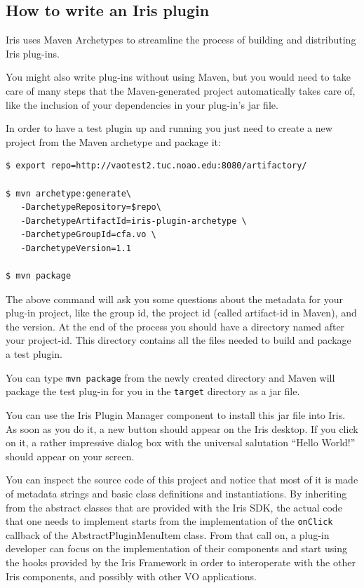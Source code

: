 \documentclass[5p]{elsarticle}
\begin{document}
\subsection{How to write an Iris plugin}
\label{sec:writeplugin}
Iris uses Maven Archetypes to streamline the process of building and distributing Iris plug-ins.

You might also write plug-ins without using Maven, but you would need to take care of many steps that the Maven-generated project automatically takes care of, like the inclusion of your dependencies in your plug-in's jar file.

In order to have a test plugin up and running you just need to create a new project from the Maven archetype and package it:

\begin{lstlisting}[style=code]
$ export repo=http://vaotest2.tuc.noao.edu:8080/artifactory/

$ mvn archetype:generate\
   -DarchetypeRepository=$repo\
   -DarchetypeArtifactId=iris-plugin-archetype \
   -DarchetypeGroupId=cfa.vo \
   -DarchetypeVersion=1.1

$ mvn package
\end{lstlisting}

The above command will ask you some questions about the metadata for your plug-in project, like the group id, the project id (called artifact-id in Maven), and the version. At the end of the process you should have a directory named after your project-id. This directory contains all the files needed to build and package a test plugin.

You can type \verb|mvn package| from the newly created directory and Maven will package the test plug-in for you in the \verb|target| directory as a jar file.

You can use the Iris Plugin Manager component to install this jar file into Iris. As soon as you do it, a new button should appear on the Iris desktop. If you click on it, a rather impressive dialog box with the universal salutation ``Hello World!'' should appear on your screen.

You can inspect the source code of this project and notice that most of it is made of metadata strings and basic class definitions and instantiations. By inheriting from the abstract classes that are provided with the Iris SDK, the actual code that one needs to implement starts from the implementation of the \verb|onClick| callback of the AbstractPluginMenuItem class. From that call on, a plug-in developer can focus on the implementation of their components and start using the hooks provided by the Iris Framework in order to interoperate with the other Iris components, and possibly with other VO applications.
\end{document}
